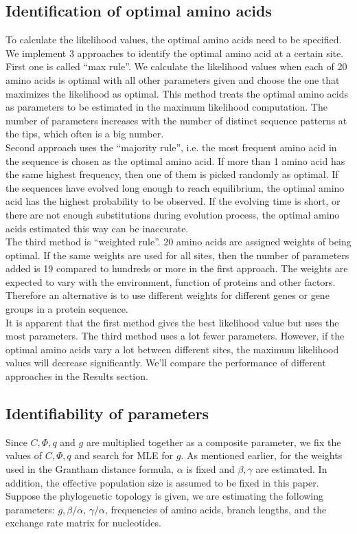 \documentclass[13pt]{article}
\begin{document}
\subsection{Identification of optimal amino acids}
To calculate the likelihood values, the optimal amino acids need to be specified. We implement 3 approaches to identify the optimal amino acid at a certain site. First one is called ``max rule''. We calculate the likelihood values when each of 20 amino acids is optimal with all other parameters given and choose the one that maximizes the likelihood as optimal. This method treats the optimal amino acids as parameters to be estimated in the maximum likelihood computation. The number of parameters increases with the number of distinct sequence patterns at the tips, which often is a big number. \\
Second approach uses the ``majority rule'', i.e. the most frequent amino acid in the sequence is chosen as the optimal amino acid. If more than 1 amino acid has the same highest frequency, then one of them is picked randomly as optimal. If the sequences have evolved long enough to reach equilibrium, the optimal amino acid has the highest probability to be observed. If the evolving time is short, or there are not enough substitutions during evolution process, the optimal amino acids estimated this way can be inaccurate. \\
The third method is ``weighted rule''. 20 amino acids are assigned weights of being optimal. If the same weights are used for all sites, then the number of parameters added is 19 compared to hundreds or more in the first approach. The weights are expected to vary with the environment, function of proteins and other factors. Therefore an alternative is to use different weights for different genes or gene groups in a protein sequence. \\
It is apparent that the first method gives the best likelihood value but uses the most parameters. The third method uses a lot fewer parameters. However, if the optimal amino acids vary a lot between different sites, the maximum likelihood values will decrease significantly. We'll compare the performance of different approaches in the Results section.\\

\subsection{Identifiability of parameters}
Since $C, \Phi, q$ and $g$ are multiplied together as a composite parameter, we fix the values of $C, \Phi, q$ and search for MLE for $g$. As mentioned earlier, for the weights used in the Grantham distance formula, $\alpha$ is fixed and $\beta, \gamma$ are estimated.  In addition, the effective population size is assumed to be fixed in this paper. Suppose the phylogenetic topology is given, we are estimating the following parameters: $g, \beta/\alpha$, $\gamma/\alpha$, frequencies of amino acids, branch lengths, and the exchange rate matrix for nucleotides. 
\end{document}
